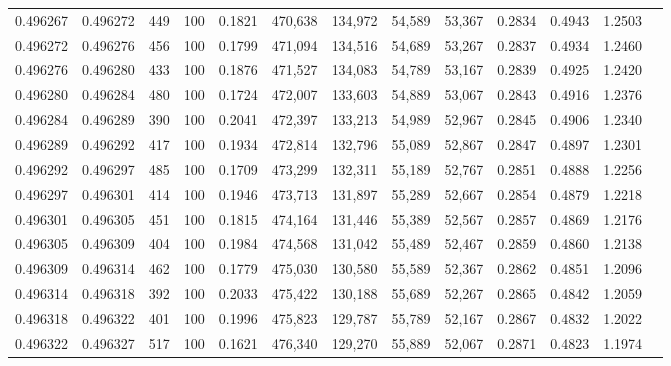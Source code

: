 \begin{tabular}{rrrrrrrrrrrrr}
0.496267 & 0.496272 &   449 & 100 &                                     0.1821 & 470,638 & 134,972 &  54,589 &  53,367 & 0.2834 & 0.4943 & 1.2503 \\
0.496272 & 0.496276 &   456 & 100 &                                     0.1799 & 471,094 & 134,516 &  54,689 &  53,267 & 0.2837 & 0.4934 & 1.2460 \\
0.496276 & 0.496280 &   433 & 100 &                                     0.1876 & 471,527 & 134,083 &  54,789 &  53,167 & 0.2839 & 0.4925 & 1.2420 \\
0.496280 & 0.496284 &   480 & 100 &                                     0.1724 & 472,007 & 133,603 &  54,889 &  53,067 & 0.2843 & 0.4916 & 1.2376 \\
0.496284 & 0.496289 &   390 & 100 &                                     0.2041 & 472,397 & 133,213 &  54,989 &  52,967 & 0.2845 & 0.4906 & 1.2340 \\
0.496289 & 0.496292 &   417 & 100 &                                     0.1934 & 472,814 & 132,796 &  55,089 &  52,867 & 0.2847 & 0.4897 & 1.2301 \\
0.496292 & 0.496297 &   485 & 100 &                                     0.1709 & 473,299 & 132,311 &  55,189 &  52,767 & 0.2851 & 0.4888 & 1.2256 \\
0.496297 & 0.496301 &   414 & 100 &                                     0.1946 & 473,713 & 131,897 &  55,289 &  52,667 & 0.2854 & 0.4879 & 1.2218 \\
0.496301 & 0.496305 &   451 & 100 &                                     0.1815 & 474,164 & 131,446 &  55,389 &  52,567 & 0.2857 & 0.4869 & 1.2176 \\
0.496305 & 0.496309 &   404 & 100 &                                     0.1984 & 474,568 & 131,042 &  55,489 &  52,467 & 0.2859 & 0.4860 & 1.2138 \\
0.496309 & 0.496314 &   462 & 100 &                                     0.1779 & 475,030 & 130,580 &  55,589 &  52,367 & 0.2862 & 0.4851 & 1.2096 \\
0.496314 & 0.496318 &   392 & 100 &                                     0.2033 & 475,422 & 130,188 &  55,689 &  52,267 & 0.2865 & 0.4842 & 1.2059 \\
0.496318 & 0.496322 &   401 & 100 &                                     0.1996 & 475,823 & 129,787 &  55,789 &  52,167 & 0.2867 & 0.4832 & 1.2022 \\
0.496322 & 0.496327 &   517 & 100 &                                     0.1621 & 476,340 & 129,270 &  55,889 &  52,067 & 0.2871 & 0.4823 & 1.1974 \\

\end{tabular}
